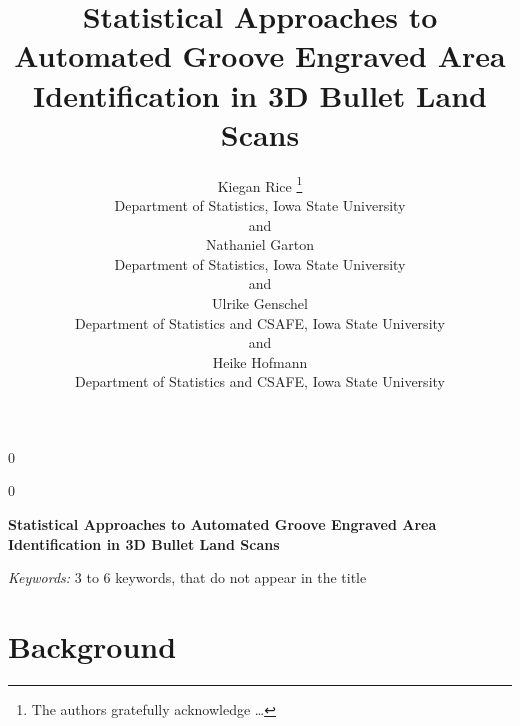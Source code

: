 \documentclass[12pt]{article}
\newcommand{\blind}{0}
\begin{document}
\def\spacingset#1{\renewcommand{\baselinestretch}%
{#1}\small\normalsize} \spacingset{1}




\blind
{
  \title{\bf Statistical Approaches to Automated Groove Engraved Area Identification
in 3D Bullet Land Scans}

  \author{
        Kiegan Rice \thanks{The authors gratefully acknowledge \ldots{}} \\
    Department of Statistics, Iowa State University\\
     and \\     Nathaniel Garton \\
    Department of Statistics, Iowa State University\\
     and \\     Ulrike Genschel \\
    Department of Statistics and CSAFE, Iowa State University\\
     and \\     Heike Hofmann \\
    Department of Statistics and CSAFE, Iowa State University\\
      }
  \maketitle
} \fi

\blind
{
  \bigskip
  \bigskip
  \bigskip
  \begin{center}
    {\LARGE\bf Statistical Approaches to Automated Groove Engraved Area Identification
in 3D Bullet Land Scans}
  \end{center}
  \medskip
} \fi

\bigskip
\begin{abstract}

\end{abstract}

\noindent%
{\it Keywords:} 3 to 6 keywords, that do not appear in the title
\vfill

\newpage
\spacingset{1.45} %

\newcommand{\hh}[1]{{\color{orange}{#1}}}
\newcommand{\kr}[1]{{\color{teal}{#1}}}
\newcommand{\ug}[1]{{\color{purple}{#1}}}
\newcommand{\nate}[1]{{\color{olive}{#1}}}




\section{Background}
\end{document}
